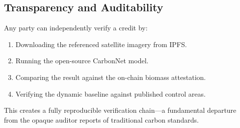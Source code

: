 \subsection{Transparency and Auditability}

Any party can independently verify a credit by:
\begin{enumerate}
  \item Downloading the referenced satellite imagery from IPFS.
  \item Running the open-source CarbonNet model.
  \item Comparing the result against the on-chain biomass attestation.
  \item Verifying the dynamic baseline against published control areas.
\end{enumerate}

This creates a fully reproducible verification chain---a fundamental
departure from the opaque auditor reports of traditional carbon
standards.


